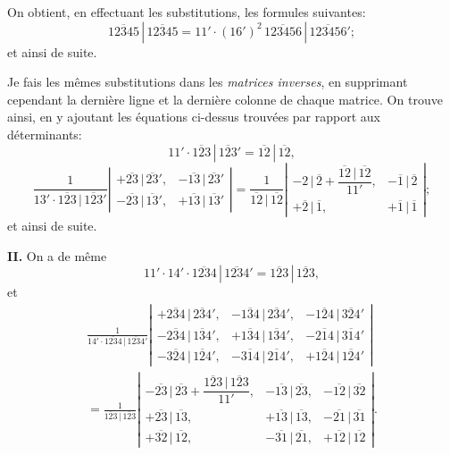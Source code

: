\documentclass[11pt,a4paper]{article}
\theoremstyle{definition}
\begin{document}
\medskip

On obtient, en effectuant les substitutions, les formules suivantes:
\[
\overline{12345}\,|\,\overline{12345}
= 11' \cdot (16')^2\,\overline{123456}\,|\,\overline{123456}';
\]
et ainsi de suite.

\medskip

Je fais les m\^emes substitutions dans les \textit{matrices inverses}, en
supprimant cependant la derni\`ere ligne et la derni\`ere colonne de chaque
matrice. On trouve ainsi, en y ajoutant les \'equations ci-dessus trouv\'ees
par rapport aux d\'eterminants:
\[
11' \cdot \overline{123}\,|\,\overline{123}'
= \overline{12}\,|\,\overline{12},
\]
\[
\frac{1}{13' \cdot \overline{123}\,|\,\overline{123}'}
\left|
\begin{array}{cc}
+\overline{23}\,|\,\overline{23}', & -\overline{13}\,|\,\overline{23}' \\
-\overline{23}\,|\,\overline{13}', & +\overline{13}\,|\,\overline{13}'
\end{array}
\right|
=
\frac{1}{\overline{12}\,|\,\overline{12}}
\left|
\begin{array}{cc}
-2\,|\,\overline{2} + \dfrac{\overline{12}\,|\,\overline{12}}{11'}, &
-\overline{1}\,|\,\overline{2} \\
+\overline{2}\,|\,\overline{1}, & +\overline{1}\,|\,\overline{1}
\end{array}
\right|;
\]
et ainsi de suite.

\medskip

\textbf{II.} On a de m\^eme
\[
11' \cdot 14' \cdot \overline{1234}\,|\,\overline{1234}'
= \overline{123}\,|\,\overline{123},
\]
et
\begin{multline*}
\frac{1}{14' \cdot \overline{1234}\,|\,\overline{1234}'}
\left|
\begin{array}{ccc}
+\overline{234}\,|\,\overline{234}', & -\overline{134}\,|\,\overline{234}', &
-\overline{124}\,|\,\overline{324}' \\
-\overline{234}\,|\,\overline{134}', & +\overline{134}\,|\,\overline{134}', &
-\overline{214}\,|\,\overline{314}' \\
-\overline{324}\,|\,\overline{124}', & -\overline{314}\,|\,\overline{214}', &
+\overline{124}\,|\,\overline{124}'
\end{array}
\right| \\
=
\frac{1}{\overline{123}\,|\,\overline{123}}
\left|
\begin{array}{ccc}
-\overline{23}\,|\,\overline{23} + \dfrac{\overline{123}\,|\,\overline{123}}{11'}, &
-\overline{13}\,|\,\overline{23}, & -\overline{12}\,|\,\overline{32} \\
+\overline{23}\,|\,\overline{13}, & +\overline{13}\,|\,\overline{13}, &
-\overline{21}\,|\,\overline{31} \\
+\overline{32}\,|\,\overline{12}, & -\overline{31}\,|\,\overline{21}, &
+\overline{12}\,|\,\overline{12}
\end{array}
\right|.
\end{multline*}
\end{document}
